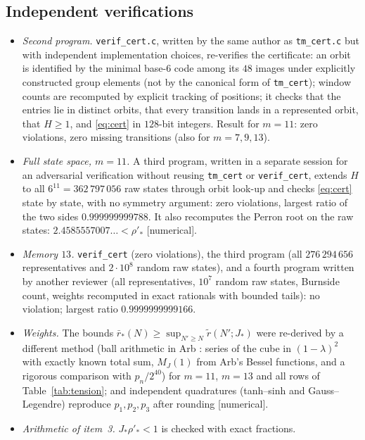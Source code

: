 \documentclass[11pt,a4paper]{article}
\theoremstyle{plain}
\theoremstyle{remark}
\numberwithin{equation}{section}
\newcommand{\rt}{\widetilde r}
\newcommand{\rb}{\bar r}
\newcommand{\st}[1]{\textsf{[#1]}}
\begin{document}
\subsection{Independent verifications}\label{sec:indep}
\begin{itemize}
\item \emph{Second program.} \texttt{verif\_cert.c}, written by the same author as \texttt{tm\_cert.c} but with independent
implementation choices, re-verifies the certificate: an orbit is identified by
the minimal base-$6$ code among its $48$ images under explicitly constructed group elements (not by the canonical form of
\texttt{tm\_cert}); window counts are recomputed by explicit tracking of positions; it checks that the entries lie in distinct orbits,
that every transition lands in a represented orbit, that $H\ge1$, and \eqref{eq:cert} in $128$-bit integers. Result for $m=11$: zero
violations, zero missing transitions (also for $m=7,9,13$).
\item \emph{Full state space, $m=11$.} A third program, written in a separate session for an adversarial verification without reusing \texttt{tm\_cert} or
\texttt{verif\_cert}, extends $H$ to all $6^{11}=362\,797\,056$ raw states through orbit look-up and checks \eqref{eq:cert} state by
state, with no symmetry argument: zero violations, largest ratio of the two sides $0.999999999788$. It also recomputes the Perron
root on the raw states: $2.4585557007\ldots<\rho'_*$ \st{numerical}.
\item \emph{Memory $13$.} \texttt{verif\_cert} (zero violations), the third program (all $276\,294\,656$ representatives and
$2\cdot10^8$ random raw states), and a fourth program written by another reviewer (all representatives, $10^7$ random raw states, Burnside count,
weights recomputed in exact rationals with bounded tails): no violation; largest ratio $0.9999999999166$.
\item \emph{Weights.} The bounds $\rb_*(N)\ge\sup_{N'\ge N}\rt(N';J_*)$ were re-derived by a different method (ball arithmetic in Arb
\cite{Joh17}: series of the cube in $(1-\lambda)^2$ with exactly known total sum, $M_J(1)$ from Arb's Bessel functions, and a
rigorous comparison with $p_n/2^{40}$) for $m=11$, $m=13$ and all rows of Table~\ref{tab:tension}; and independent quadratures
(tanh--sinh and Gauss--Legendre) reproduce $p_1,p_2,p_3$ after rounding \st{numerical}.
\item \emph{Arithmetic of item~3.} $J_*\rho'_*<1$ is checked with exact fractions.
\end{itemize}
\end{document}
